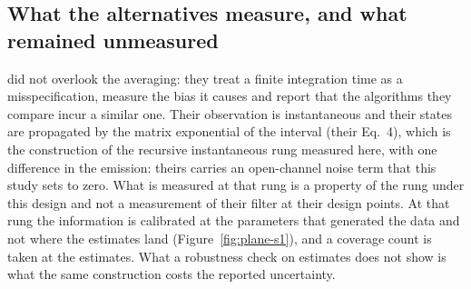 \subsection*{What the alternatives measure, and what remained unmeasured}
\citet{munch2022bayesian} did not overlook the averaging: they treat a finite integration time as a misspecification, measure the bias it causes and report that the algorithms they compare incur a similar one. Their observation is instantaneous and their states are propagated by the matrix exponential of the interval (their Eq.~4), which is the construction of the recursive instantaneous rung measured here, with one difference in the emission: theirs carries an open-channel noise term that this study sets to zero. What is measured at that rung is a property of the rung under this design and not a measurement of their filter at their design points. At that rung the information is calibrated at the parameters that generated the data and not where the estimates land (Figure~\ref{fig:plane-s1}), and a coverage count is taken at the estimates. What a robustness check on estimates does not show is what the same construction costs the reported uncertainty.

